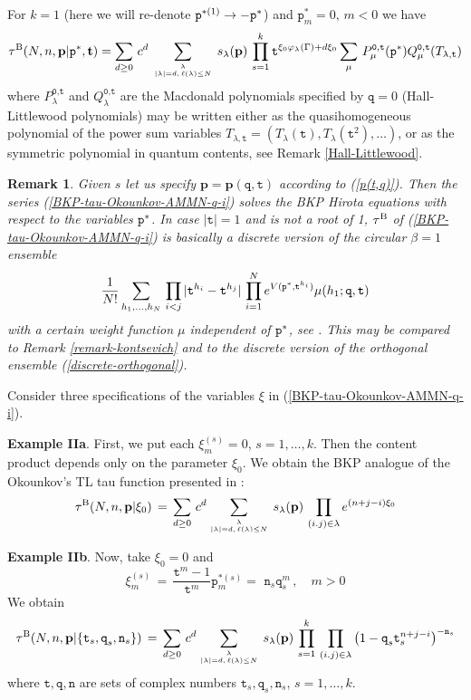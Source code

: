 \documentclass[a4paper,10pt]{article}
\newcommand{\bpow}{\mathbf{p}}
\theoremstyle{plain}
\newtheorem{Remark}{Remark}
\theoremstyle{remark}
\def\be{\begin{equation}}
\def\ee{\end{equation}}
\def\br{\begin{Remark}\rm\small}
\def\er{\end{Remark}}
\def\bea{\begin{eqnarray}}
\def\eea{\end{eqnarray}}
\begin{document}
For $k=1$ (here we will re-denote ${\bf\texttt{p}}^{*(1)}\to -{\bf \texttt{p}}^*$) and $\texttt{p}^*_m=0,\,m<0$ we have
\bea
\label{BKP-via-Hall-Littlewood}
\tau^{\rm B}(N,n,\bpow|{\bf \texttt{p}}^*,{\bf t})=\sum_{d\ge 0}\, c^d
\,\sum_{\lambda\atop |\lambda|=d,\, \ell(\lambda)\le N}\,s_\lambda(\bpow)\,\prod_{s=1}^k
{\texttt{t}}^{\xi_0 \varphi_\lambda(\Gamma)+d\xi_0}\sum_{\mu}\,
P^{\texttt{0},\texttt{t}}_\mu({\bf \texttt{p}}^*) Q^{\texttt{0},\texttt{t}}_\mu(T_{\lambda,\texttt{t}})
\eea
where $P^{\texttt{0},\texttt{t}}_\lambda$ and $Q^{\texttt{0},\texttt{t}}_\lambda$ are the
Macdonald polynomials specified by $\texttt{q}=0$  (Hall-Littlewood polynomials)
 may be written either as the quasihomogeneous polynomial of the
power sum variables $T_{\lambda,\texttt{t}}=(T_\lambda(\texttt{t}),T_\lambda(\texttt{t}^2),\dots)$, or as the symmetric polynomial in quantum
contents, see Remark \ref{Hall-Littlewood}.





\br\label{circular-beta=1}
Given $s$ let us specify $\bpow=\bpow(\texttt{q},\texttt{t})$ according to (\ref{p(t,q)}). Then
the series (\ref{BKP-tau-Okounkov-AMMN-q-i}) solves the BKP Hirota equations with respect to the variables
${\bf\texttt{p}}^{*}$. In case $|\texttt{t}|=1$ and is not a root of 1,
$\tau^{\rm B}$ of (\ref{BKP-tau-Okounkov-AMMN-q-i})
is basically a discrete version of the circular $\beta=1$ ensemble
\[
 \frac{1}{N!} \sum_{h_1,\dots,h_N}\,\prod_{i<j}|\texttt{t}^{h_i}-\texttt{t}^{h_j}| \,
 \prod_{i=1}^N e^{V({\bf\texttt{p}}^{*},\texttt{t}^{h_i})} \mu(h_1;\texttt{q},\texttt{t})
\]
with a certain weight function $\mu$ independent of ${\bf \texttt{p}}^*$,
see \cite{OST-I}. This may be compared to Remark \ref{remark-kontsevich} and to the discrete version
of the orthogonal ensemble (\ref{discrete-orthogonal}).
\er

Consider three specifications of the variables $\xi$ in (\ref{BKP-tau-Okounkov-AMMN-q-i}).

{\bf Example IIa}. First, we put each $\xi^{(s)}_m=0$, $s=1,\dots,k$. Then the content product depends only
on the parameter $\xi_0$. We obtain the BKP analogue of the Okounkov's TL tau function presented in \cite{Okounkov-2000}:
\be\label{BKP-Okounkov}
\tau^{\rm B}(N,n,\bpow |\xi_0)\,=\,\sum_{d\ge 0} \,c^d
\sum_{\lambda\atop |\lambda|=d,\, \ell(\lambda)\le N}\,s_\lambda(\bpow)\,
\prod_{(i.j)\in\lambda} e^{(n+j-i) \xi_0 }
\ee


{\bf Example IIb}. Now, take $\xi_0=0$ and
\be
\label{xi-for-trig-Pochhamer}
 \xi_m^{(s)}  \,=\,\frac{\texttt{t}^m-1}{\texttt{t}^m}\texttt{p}_m^{*(s)}=\,\, \texttt{n}_s \texttt{q}_s^{m} \,,\quad m>0
\ee
We obtain
\be\label{BKP-tau-trig-Pochhammer-n-i}
\tau^{\rm B}(N,n,\bpow | \{\texttt{t}_s,\texttt{q}_s,\texttt{n}_s \} )\,=\,\sum_{d\ge 0}\, c^d
\sum_{\lambda\atop |\lambda|=d,\, \ell(\lambda)\le N}\,s_\lambda(\bpow)\,
\prod_{s=1}^k\,\prod_{(i.j)\in\lambda}\left( 1-\texttt{q}_s\texttt{t}_s^{n+j-i} \right)^{-\texttt{n}_s}
\ee
where $\texttt{t},\texttt{q},\texttt{n}$ are sets of complex numbers
$\texttt{t}_s,\texttt{q}_s,\texttt{n}_s$, $s=1,\dots,k$.
\end{document}
